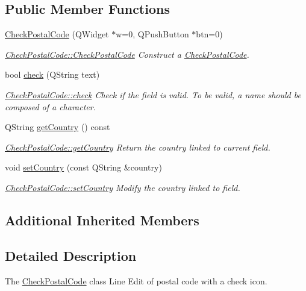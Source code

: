 \subsection*{Public Member Functions}
\begin{DoxyCompactItemize}
\item 
\hyperlink{classCheckPostalCode_a98cce06b95b46bf285cf6bc6e52cbfcb}{Check\-Postal\-Code} (Q\-Widget $\ast$w=0, Q\-Push\-Button $\ast$btn=0)
\begin{DoxyCompactList}\small\item\em \hyperlink{classCheckPostalCode_a98cce06b95b46bf285cf6bc6e52cbfcb}{Check\-Postal\-Code\-::\-Check\-Postal\-Code} Construct a \hyperlink{classCheckPostalCode}{Check\-Postal\-Code}. \end{DoxyCompactList}\item 
bool \hyperlink{classCheckPostalCode_ad91ba5622617675fbb5c767036163142}{check} (Q\-String text)
\begin{DoxyCompactList}\small\item\em \hyperlink{classCheckPostalCode_ad91ba5622617675fbb5c767036163142}{Check\-Postal\-Code\-::check} Check if the field is valid. To be valid, a name should be composed of a character. \end{DoxyCompactList}\item 
Q\-String \hyperlink{classCheckPostalCode_a3691eb5a484579a77622529ae25261a4}{get\-Country} () const 
\begin{DoxyCompactList}\small\item\em \hyperlink{classCheckPostalCode_a3691eb5a484579a77622529ae25261a4}{Check\-Postal\-Code\-::get\-Country} Return the country linked to current field. \end{DoxyCompactList}\item 
void \hyperlink{classCheckPostalCode_ac82e538c932bd9165d3d40ea949baa4b}{set\-Country} (const Q\-String \&country)
\begin{DoxyCompactList}\small\item\em \hyperlink{classCheckPostalCode_ac82e538c932bd9165d3d40ea949baa4b}{Check\-Postal\-Code\-::set\-Country} Modify the {\itshape country} linked to field. \end{DoxyCompactList}\end{DoxyCompactItemize}
\subsection*{Additional Inherited Members}


\subsection{Detailed Description}
The \hyperlink{classCheckPostalCode}{Check\-Postal\-Code} class Line Edit of postal code with a check icon. 


